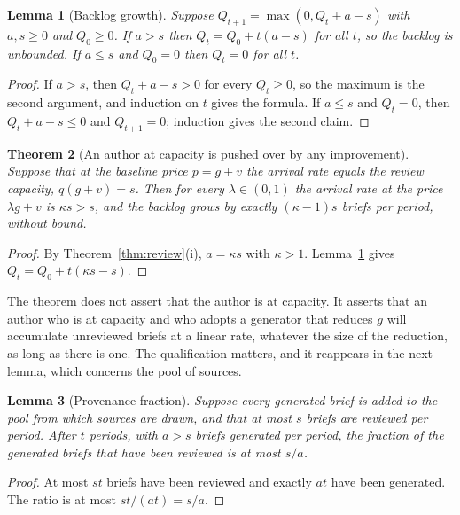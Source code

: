 \documentclass[11pt]{article}
\theoremstyle{plain}
\newtheorem{theorem}{Theorem}[section]
\newtheorem{lemma}[theorem]{Lemma}
\theoremstyle{definition}
\theoremstyle{remark}
\begin{document}
\begin{lemma}[Backlog growth]\label{lem:backlog}
Suppose $Q_{t+1}=\max(0,Q_t+a-s)$ with $a,s\ge0$ and $Q_0\ge0$. If $a>s$ then $Q_t=Q_0+t(a-s)$ for all $t$, so the backlog is unbounded. If $a\le s$ and $Q_0=0$ then $Q_t=0$ for all $t$.
\end{lemma}

\begin{proof}
If $a>s$, then $Q_t+a-s>0$ for every $Q_t\ge0$, so the maximum is the second argument, and induction on $t$ gives the formula. If $a\le s$ and $Q_t=0$, then $Q_t+a-s\le0$ and $Q_{t+1}=0$; induction gives the second claim. \qedhere
\end{proof}

\begin{theorem}[An author at capacity is pushed over by any improvement]\label{thm:capacity}
Suppose that at the baseline price $p=g+v$ the arrival rate equals the review capacity, $q(g+v)=s$. Then for every $\lambda\in(0,1)$ the arrival rate at the price $\lambda g+v$ is $\kappa s>s$, and the backlog grows by exactly $(\kappa-1)s$ briefs per period, without bound.
\end{theorem}

\begin{proof}
By Theorem~\ref{thm:review}(i), $a=\kappa s$ with $\kappa>1$. Lemma~\ref{lem:backlog} gives $Q_t=Q_0+t(\kappa s-s)$. \qedhere
\end{proof}

The theorem does not assert that the author is at capacity. It asserts that an author who is at capacity and who adopts a generator that reduces $g$ will accumulate unreviewed briefs at a linear rate, whatever the size of the reduction, as long as there is one. The qualification matters, and it reappears in the next lemma, which concerns the pool of sources.

\begin{lemma}[Provenance fraction]\label{lem:provenance}
Suppose every generated brief is added to the pool from which sources are drawn, and that at most $s$ briefs are reviewed per period. After $t$ periods, with $a>s$ briefs generated per period, the fraction of the generated briefs that have been reviewed is at most $s/a$.
\end{lemma}

\begin{proof}
At most $st$ briefs have been reviewed and exactly $at$ have been generated. The ratio is at most $st/(at)=s/a$. \qedhere
\end{proof}
\end{document}
